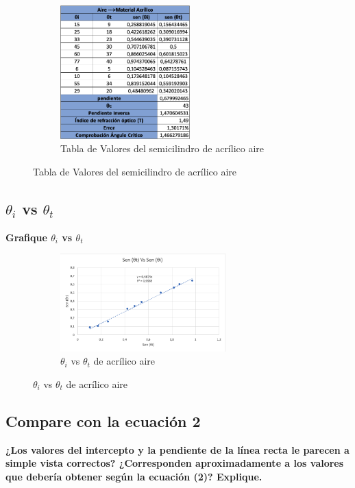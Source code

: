 \begin{figure}[H]
  \centering
  \begin{subfigure}[b]{\textwidth}
      \centering
      \includegraphics[width=0.55\textwidth]{Figures/1. Content/tabla1.png}
      \caption{Tabla de Valores del semicilindro de acrílico aire}
      \label{fig: Tabla 1}
  \end{subfigure}
  \hfill
\end{figure}


\subsection{$\theta_{i}$ vs $\theta_{t}$}
\textbf{Grafique $\theta_{i}$ vs $\theta_{t}$}

\begin{figure}[H]
  \centering
  \begin{subfigure}[b]{\textwidth}
      \centering
      \includegraphics[width=0.7\textwidth]{Figures/1. Content/grafica1.png}
      \caption{$\theta_{i}$ vs $\theta_{t}$ de acrílico aire}
      \label{fig: Grafica 1}
  \end{subfigure}
  \hfill
\end{figure}

\subsection{Compare con la ecuación 2}
\textbf{¿Los valores del intercepto y la pendiente de la línea recta le parecen a simple vista
correctos? ¿Corresponden aproximadamente a los valores que debería obtener
según la ecuación (2)? Explique.}

